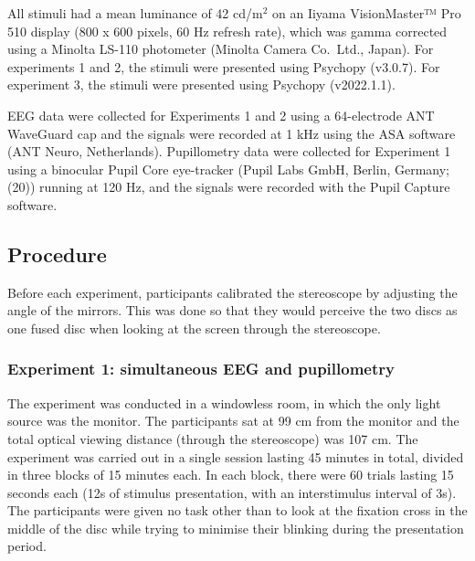 \documentclass[
]{article}
\begin{document}
All stimuli had a mean luminance of 42 cd/m\(^2\) on an Iiyama VisionMaster™ Pro 510 display (800 x 600 pixels, 60 Hz refresh rate), which was gamma corrected using a Minolta LS-110 photometer (Minolta Camera Co.~Ltd., Japan). For experiments 1 and 2, the stimuli were presented using Psychopy (v3.0.7). For experiment 3, the stimuli were presented using Psychopy (v2022.1.1).

EEG data were collected for Experiments 1 and 2 using a 64-electrode ANT WaveGuard cap and the signals were recorded at 1 kHz using the ASA software (ANT Neuro, Netherlands). Pupillometry data were collected for Experiment 1 using a binocular Pupil Core eye-tracker (Pupil Labs GmbH, Berlin, Germany; (20)) running at 120 Hz, and the signals were recorded with the Pupil Capture software.

\hypertarget{procedure}{%
\subsection{Procedure}\label{procedure}}

Before each experiment, participants calibrated the stereoscope by adjusting the angle of the mirrors. This was done so that they would perceive the two discs as one fused disc when looking at the screen through the stereoscope.

\hypertarget{experiment-1-simultaneous-eeg-and-pupillometry}{%
\subsubsection{Experiment 1: simultaneous EEG and pupillometry}\label{experiment-1-simultaneous-eeg-and-pupillometry}}

The experiment was conducted in a windowless room, in which the only light source was the monitor. The participants sat at 99 cm from the monitor and the total optical viewing distance (through the stereoscope) was 107 cm. The experiment was carried out in a single session lasting 45 minutes in total, divided in three blocks of 15 minutes each. In each block, there were 60 trials lasting 15 seconds each (12s of stimulus presentation, with an interstimulus interval of 3s). The participants were given no task other than to look at the fixation cross in the middle of the disc while trying to minimise their blinking during the presentation period.
\end{document}
